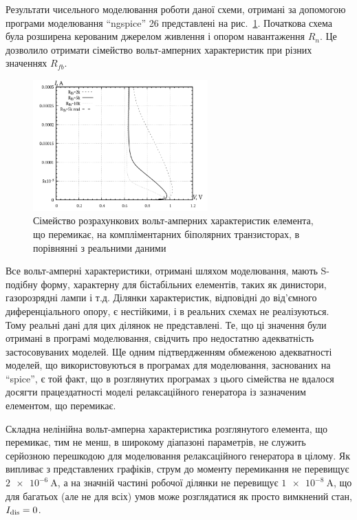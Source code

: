 Результати чисельного моделювання роботи даної схеми, отримані
за допомогою програми моделювання ``ngspice'' 26 представлені на
рис.~\ref{atu:f:relax3d_sw_vah}. Початкова схема була розширена керованим
джерелом живлення і опором навантаження
$ R_n $. Це дозволило отримати сімейство вольт-амперних
характеристик при різних значеннях
$ R_{fb} $.

\begin{figure}[htb!]
  \centerline{\includegraphics[width=0.6\textwidth]{p/relax3d_sw_va.png} }
\caption{Сімейство розрахункових вольт-амперних характеристик
елемента, що перемикає, на компліментарних біполярних
транзисторах, в порівнянні з реальними даними}
\label{atu:f:relax3d_sw_vah}
\end{figure}


Все вольт-амперні характеристики, отримані шляхом моделювання,
мають S-подібну форму, характерну для бістабільних
елементів, таких як динистори, газорозрядні лампи і т.д. Ділянки
характеристик, відповідні до від'ємного диференціального
опору, є нестійкими, і в реальних схемах не реалізуються. Тому
реальні дані для цих ділянок не представлені. Те, що ці значення
були отримані в програмі моделювання, свідчить про недостатню
адекватність застосовуваних моделей. Ще одним підтвердженням
обмеженою адекватності моделей, що використовуються в
програмах для моделювання, заснованих на ``spice'', є той факт, що
в розглянутих програмах з цього сімейства не вдалося досягти
працездатності моделі релаксаційного генератора із зазначеним
елементом, що перемикає.


Складна нелінійна вольт-амперна характеристика розглянутого
елемента, що перемикає, тим не менш, в широкому діапазоні
параметрів, не служить серйозною перешкодою для
моделювання релаксаційного генератора в цілому. Як випливає
з представлених графіків, струм до моменту перемикання не
перевищує
$ \SI{2 e-6}{\ampere} $, а на значній частині робочої ділянки не перевищує
$ \SI{1e-8}{\ampere} $, що для багатьох (але не для всіх) умов може
розглядатися як просто вимкнений стан,
$ I _\mathrm{dis} = 0 $.


